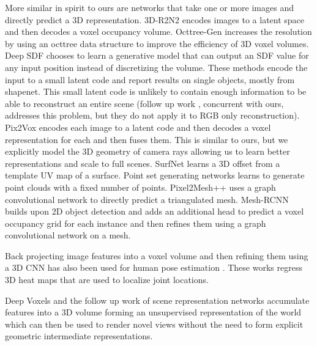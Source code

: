 \documentclass[runningheads]{llncs}
\begin{document}
More similar in spirit to ours are networks that take one or more images and directly predict a 3D representation.
3D-R2N2 \cite{choy20163d} encodes images to a latent space and then decodes a voxel occupancy volume.
Octtree-Gen\cite{tatarchenko2017octree} increases the resolution by using an octtree data structure to improve the efficiency of 3D voxel volumes.
Deep SDF\cite{park2019deepsdf} chooses to learn a generative model that can output an SDF value for any input position instead of discretizing the volume.
These methods encode the input to a small latent code and report results on single objects, mostly from shapenet\cite{chang2015shapenet}.
This small latent code is unlikely to contain enough information to be able to reconstruct an entire scene (follow up work \cite{chabra2020deep}, concurrent with ours, addresses this problem, but they do not apply it to RGB only reconstruction).
Pix2Vox \cite{xie2019pix2vox} encodes each image to a latent code and then decodes a voxel representation for each and then fuses them. This is similar to ours, but we explicitly model the 3D geometry of camera rays allowing us to learn better representations and scale to full scenes.
SurfNet \cite{sinha2017surfnet} learns a 3D offset from a template UV map of a surface.
Point set generating networks\cite{fan2017point} learns to generate point clouds with a fixed number of points.
Pixel2Mesh++\cite{wang2018pixel2mesh} uses a graph convolutional network to directly predict a triangulated mesh.
Mesh-RCNN \cite{gkioxari2019mesh} builds upon 2D object detection\cite{he2017mask} and adds an additional head to predict a voxel occupancy grid for each instance and then refines them using a graph convolutional network on a mesh.

Back projecting image features into a voxel volume and then refining them using a 3D CNN has also been used for human pose estimation \cite{zimmermann2019freihand, iskakov2019learnable}.
These works regress 3D heat maps that are used to localize joint locations.

Deep Voxels \cite{sitzmann2019deepvoxels} and the follow up work of scene representation networks\cite{sitzmann2019srns} accumulate features into a 3D volume forming an unsupervised representation of the world which can then be used to render novel views without the need to form explicit geometric intermediate representations.
\end{document}
